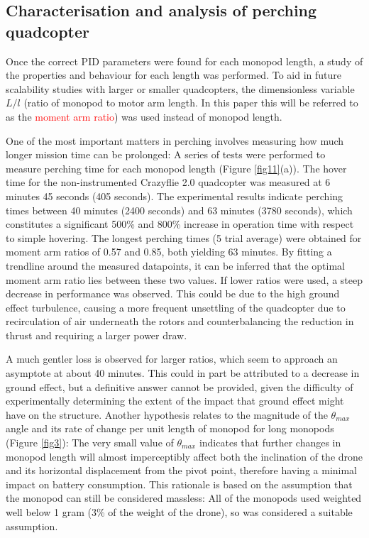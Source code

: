 \documentclass[12pt,a4paper]{article}
\begin{document}
\subsection{Characterisation and analysis of perching quadcopter}
Once the correct PID parameters were found for each monopod length, a study of the properties and behaviour for each length was performed. To aid in future scalability studies with larger or smaller quadcopters, the dimensionless variable $L/l$ (ratio of monopod to motor arm length. In this paper this will be referred to as the \textcolor{red}{moment arm ratio}) was used instead of monopod length.

One of the most important matters in perching involves measuring how much longer mission time can be prolonged: A series of tests were performed to measure perching time for each monopod length (Figure \ref{fig11}(a)). The hover time for the non-instrumented Crazyflie 2.0 quadcopter was measured at 6 minutes 45 seconds (405 seconds). The experimental results indicate perching times between 40 minutes (2400 seconds) and 63 minutes (3780 seconds), which constitutes a significant 500\% and 800\% increase in operation time with respect to simple hovering. The longest perching times (5 trial average) were obtained for moment arm ratios of 0.57 and 0.85, both yielding 63 minutes. By fitting a trendline around the measured datapoints, it can be inferred that the optimal moment arm ratio lies between these two values. If lower ratios were used, a steep decrease in performance was observed. This could be due to the high ground effect turbulence, causing a more frequent unsettling of the quadcopter due to recirculation of air underneath the rotors and counterbalancing the reduction in thrust and requiring a larger power draw. 

A much gentler loss is observed for larger ratios, which seem to approach an asymptote at about 40 minutes. This could in part be attributed to a decrease in ground effect, but a definitive answer cannot be provided, given the difficulty of experimentally determining the extent of the impact that ground effect might have on the structure. Another hypothesis relates to the magnitude of the $\theta_{max}$ angle and its rate of change per unit length of monopod for long monopods (Figure \ref{fig3}): The very small value of $\theta_{max}$ indicates that further changes in monopod length will almost imperceptibly affect both the inclination of the drone and its horizontal displacement from the pivot point, therefore having a minimal impact on battery consumption. This rationale is based on the assumption that the monopod can still be considered massless: All of the monopods used weighted well below 1 gram (3\% of the weight of the drone), so was considered a suitable assumption.
\end{document}
